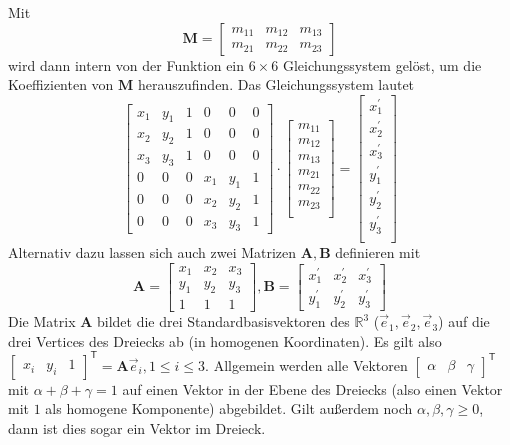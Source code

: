 \documentclass{whswinvcbook}
\begin{document}
Mit $$\mathbf{M}=\begin{bmatrix}m_{11}&m_{12}&m_{13}\\m_{21}&m_{22}&m_{23}\end{bmatrix}$$ wird dann intern von der Funktion ein $6\times6$ Gleichungssystem gelöst, um die Koeffizienten von $\mathbf{M}$ herauszufinden. Das Gleichungssystem lautet $$\begin{bmatrix}x_1&y_1&1&0&0&0\\x_2&y_2&1&0&0&0\\x_3&y_3&1&0&0&0\\0&0&0&x_1&y_1&1\\0&0&0&x_2&y_2&1\\0&0&0&x_3&y_3&1\end{bmatrix}\cdot\begin{bmatrix}m_{11}\\m_{12}\\m_{13}\\m_{21}\\m_{22}\\m_{23}\\\end{bmatrix}=\begin{bmatrix}x_1^\prime\\x_2^\prime\\x_3^\prime\\y_1^\prime\\y_2^\prime\\y_3^\prime\\\end{bmatrix}$$
Alternativ dazu lassen sich auch zwei Matrizen $\mathbf{A},\mathbf{B}$ definieren mit $$\mathbf{A}=\begin{bmatrix}x_1&x_2&x_3\\y_1&y_2&y_3\\1&1&1\end{bmatrix},\mathbf{B}=\begin{bmatrix}x_1^\prime&x_2^\prime&x_3^\prime\\y_1^\prime&y_2^\prime&y_3^\prime\end{bmatrix}$$
Die Matrix $\mathbf{A}$ bildet die drei Standardbasisvektoren des $\mathbb{R}^3$ ($\vec{e}_1,\vec{e}_2,\vec{e}_3$) auf die drei Vertices des Dreiecks ab (in homogenen Koordinaten). Es gilt also $\begin{bmatrix}x_i&y_i&1\end{bmatrix}^\mathsf{T}=\mathbf{A}\vec{e}_i,1\leq i\leq3$. Allgemein werden alle Vektoren $\begin{bmatrix}\alpha&\beta&\gamma\end{bmatrix}^\mathsf{T}$ mit $\alpha+\beta+\gamma=1$ auf einen Vektor in der Ebene des Dreiecks (also einen Vektor mit $1$ als homogene Komponente) abgebildet. Gilt außerdem noch $\alpha,\beta,\gamma\geq0$, dann ist dies sogar ein Vektor im Dreieck.
\end{document}
